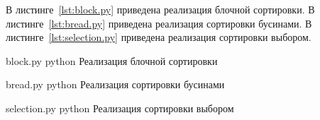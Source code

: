 В листинге~\ref{lst:block.py} приведена реализация блочной сортировки.
В листинге~\ref{lst:bread.py} приведена реализация сортировки бусинами.
В листинге~\ref{lst:selection.py} приведена реализация сортировки выбором.

\clearpage
{}
	{block.py} %
	{python} %
	{Реализация блочной сортировки} %

\clearpage

	{bread.py} %
	{python} %
	{Реализация сортировки бусинами} %

\clearpage

	{selection.py} %
	{python} %
	{Реализация сортировки выбором} %

\clearpage
